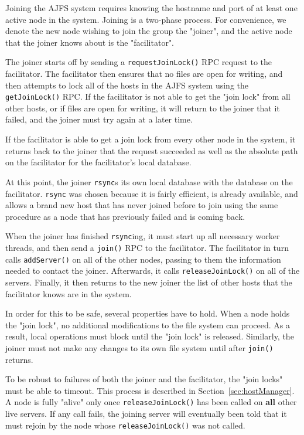
Joining the AJFS system requires knowing the hostname and port of at least one
active node in the system. Joining is a two-phase process. For convenience, we
denote the new node wishing to join the group the "joiner", and the active node
that the joiner knows about is the "facilitator".

The joiner starts off by sending a \texttt{requestJoinLock()} RPC request to the
facilitator. The facilitator then ensures that no files are open for writing,
and then attempts to lock all of the hosts in the AJFS system using the
\texttt{getJoinLock()} RPC. If the facilitator is not able to get the "join
lock" from all other hosts, or if files are open for writing, it will return to
the joiner that it failed, and the joiner must try again at a later time.

If the facilitator is able to get a join lock from every other node in the
system, it returns back to the joiner that the request succeeded as well as the
absolute path on the facilitator for the facilitator's local database.

At this point, the joiner \texttt{rsync}s its own local database with the
database on the facilitator. \texttt{rsync} was chosen because it is fairly
efficient, is already available, and allows a brand new host that has never
joined before to join using the same procedure as a node that has previously
failed and is coming back.

When the joiner has finished \texttt{rsync}ing, it must start up all necessary
worker threads, and then send a \texttt{join()} RPC to the facilitator. The
facilitator in turn calls \texttt{addServer()} on all of the other nodes,
passing to them the information needed to contact the joiner. Afterwards, it
calls \texttt{releaseJoinLock()} on all of the servers. Finally, it then returns
to the new joiner the list of other hosts that the facilitator knows are in the
system.

In order for this to be safe, several properties have to hold. When a node 
holds the "join lock", no additional modifications to the file system can
proceed. As a result, local operations must block until the "join lock" is
released. Similarly, the joiner must not make any changes to its own file system
until after \texttt{join()} returns.

To be robust to failures of both the joiner and the facilitator, the "join
locks" must be able to timeout. This process is described in
Section~\ref{sec:hostManager}. A node is fully "alive" only once
\texttt{releaseJoinLock()} has been called on \textbf{all} other live servers.
If any call fails, the joining server will eventually been told that it must
rejoin by the node whose \texttt{releaseJoinLock()} was not called.

